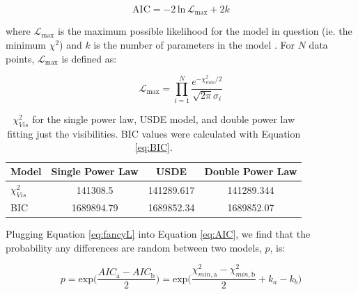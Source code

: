 {{\begin{equation}
\label{eq:AIC}
\text{AIC} = -2\,\text{ln}\,\mathcal{L}_{\text{max}} + 2k
\end{equation}

where $\mathcal{L}_{\text{max}}$ is the maximum possible likelihood for the model in question (ie. the minimum $\chi^{2}$) and $k$ is the number of parameters in the model \citep{Akai74}. For $N$ data points, $\mathcal{L}_{\text{max}}$ is defined as:

\begin{equation}
\label{eq:fancyL}
\mathcal{L}_{\text{max}} = \prod_{i=1}^{N} \frac{e^{-\chi^{2}_{min}/2}}{\sqrt{2\pi} \sigma_{i}}
\end{equation} 

\begin{table}[t!]
\begin{center}
\def\arraystretch{1.37}%
\begin{tabular}{l*{3}{c}}
\hline
\hline
Model              & Single Power Law & USDE & Double Power Law  \\
\hline
$\chi^{2}_{Vis}$ & 141308.5 & 141289.617 & 141289.344   \\
BIC           & 1689894.79 & 1689852.34 & 1689852.07 \\
\hline
\end{tabular}
\caption{$\chi^{2}_{Vis}$ for the single power law, USDE model, and double power law fitting just the visibilities. BIC values were calculated with Equation \ref{eq:BIC}.}
\end{center}
\label{tab:stats_table1}
\end{table}




Plugging Equation \ref{eq:fancyL} into Equation \ref{eq:AIC}, we find that the probability any differences are random between two models, $p$, is:

\begin{equation}
\label{eq:relLikelihood}
p = \text{exp}\bigg(\frac{AIC_{\text{a}}-AIC_{\text{b}}}{2}\bigg) =  \text{exp}\bigg(\frac{\chi^{2}_{min,\text{a}}-\chi^{2}_{min,\text{b}}}{2}\bigg + k_{a} - k_{b}\bigg)
\end{equation} 

}}
